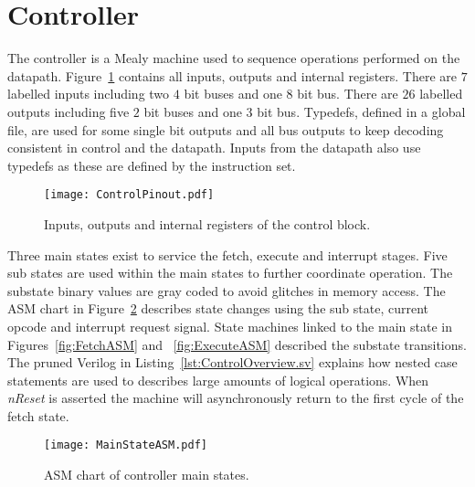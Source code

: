 \section{Controller}
\label{sec:controller}

The controller is a Mealy machine used to sequence operations performed on the datapath.
Figure~\ref{fig:ControlBlock} contains all inputs, outputs and internal registers.
There are $7$ labelled inputs including two $4$ bit buses and one $8$ bit bus.
There are $26$ labelled outputs including five $2$ bit buses and one $3$ bit bus.
Typedefs, defined in a global file, are used for some single bit outputs and all bus outputs to keep decoding consistent in control and the datapath. 
Inputs from the datapath also use typedefs as these are defined by the instruction set. 

\begin{figure}[t]
   \centering
    \texttt{[image: ControlPinout.pdf]}
		\caption{Inputs, outputs and internal registers of the control block.}%
   \label{fig:ControlBlock}
\end{figure}

Three main states exist to service the fetch, execute and interrupt stages.
Five sub states are used within the main states to further coordinate operation.
The substate binary values are gray coded to avoid glitches in memory access.
The ASM chart in Figure~\ref{fig:MainStateASM} describes state changes using the sub state, current opcode and interrupt request signal.   
State machines linked to the main state in Figures~\ref{fig:FetchASM} and ~\ref{fig:ExecuteASM} described the substate transitions.
The pruned Verilog in Listing~\ref{lst:ControlOverview.sv} explains how nested case statements are used to describes large amounts of logical operations. 
When \textit{nReset} is asserted the machine will asynchronously return to the first cycle of the fetch state.




\begin{figure}[ht]
   \centering
    \texttt{[image: MainStateASM.pdf]}
		\caption{ASM chart of controller main states.}
		\label{fig:MainStateASM}
\end{figure}


\begin{minipage}{\linewidth}

\end{minipage}









